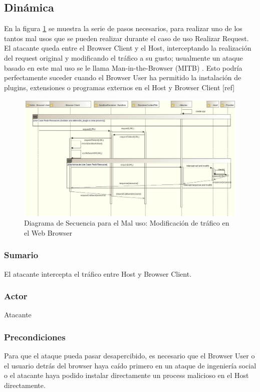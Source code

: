 \subsection{Dinámica}
En la figura \ref{fig:SeqMisuse} se muestra la serie de pasos necesarios, para realizar uno de los tantos mal usos que se pueden realizar durante el caso de uso Realizar Request. El atacante queda entre el Browser Client y el Host, interceptando la realización del request original y modificando el tráfico a su gusto; usualmente un ataque basado en este mal uso se le llama Man-in-the-Browser (MITB) \cite{Liu2012, Barth2010, Utakrit2009, Dougan2012}. Esto podría perfectamente suceder cuando el Browser User ha permitido la instalación de plugins, extensiones o programas externos en el Host y Browser Client [ref]
\begin{figure}[h]
	        \centering
	        \includegraphics[scale=0.45]{figures/chap5/patronMisuseSeq.jpg}
	        \caption{Diagrama de Secuencia para el Mal uso: Modificación de tráfico en el Web Browser}
	        \label{fig:SeqMisuse}
    \end{figure}
	
	\subsubsection{Sumario} El atacante intercepta el tráfico entre Host y Browser Client.
	\subsubsection{Actor} Atacante
	\subsubsection{Precondiciones} Para que el ataque pueda pasar desapercibido, es necesario que el Browser User o el usuario detrás del browser haya caído primero en un ataque de ingeniería social o el atacante haya podido instalar directamente un process malicioso en el Host directamente.
